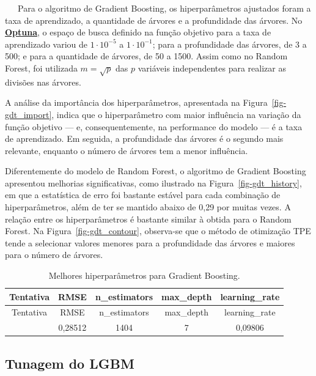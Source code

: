 \documentclass[
  12pt,
  a4paper,
]{scrreprt}
\begin{document}
~~~Para o algoritmo de Gradient Boosting, os hiperparâmetros ajustados
foram a taxa de aprendizado, a quantidade de árvores e a profundidade
das árvores. No \href{https://optuna.org/}{\textbf{Optuna}}, o espaço de
busca definido na função objetivo para a taxa de aprendizado variou de
\(1 \cdot 10^{-5}\) a \(1 \cdot 10^{-1}\); para a profundidade das
árvores, de 3 a 500; e para a quantidade de árvores, de 50 a 1500. Assim
como no Random Forest, foi utilizada \(m = \sqrt{p}\)\hspace{0pt} das
\(p\) variáveis independentes para realizar as divisões nas árvores.

\vspace{12pt}

A análise da importância dos hiperparâmetros, apresentada na
Figura~\ref{fig-gdt_import}, indica que o hiperparâmetro com maior
influência na variação da função objetivo --- e, consequentemente, na
performance do modelo --- é a taxa de aprendizado. Em seguida, a
profundidade das árvores é o segundo mais relevante, enquanto o número
de árvores tem a menor influência.

\vspace{12pt}

Diferentemente do modelo de Random Forest, o algoritmo de Gradient
Boosting apresentou melhorias significativas, como ilustrado na
Figura~\ref{fig-gdt_history}, em que a estatística de erro foi bastante
estável para cada combinação de hiperparâmetros, além de ter se mantido
abaixo de 0,29 por muitas vezes. A relação entre os hiperparâmetros é
bastante similar à obtida para o Random Forest. Na
Figura~\ref{fig-gdt_contour}, observa-se que o método de otimização TPE
tende a selecionar valores menores para a profundidade das árvores e
maiores para o número de árvores.

\begin{longtable}[]{@{}ccccc@{}}
\caption{Melhores hiperparâmetros para Gradient
Boosting.}\label{tbl-params_gdt}\tabularnewline
\toprule\noalign{}
Tentativa & RMSE & n\_estimators & max\_depth & learning\_rate \\
\midrule\noalign{}
\endfirsthead
\toprule\noalign{}
Tentativa & RMSE & n\_estimators & max\_depth & learning\_rate \\
\midrule\noalign{}
\endhead
\bottomrule\noalign{}
\endlastfoot
57 & 0,28512 & 1404 & 7 & 0,09806 \\
\end{longtable}

\subsection{Tunagem do LGBM}\label{tunagem-do-lgbm}
\end{document}
